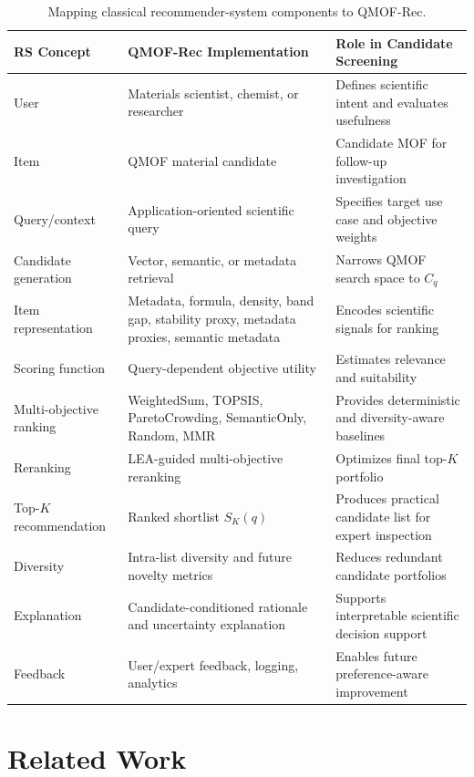 \documentclass[12pt,a4paper]{article}
\begin{document}
\begin{table}[H]
\centering
\caption{Mapping classical recommender-system components to QMOF-Rec.}
\label{tab:rec_mapping}
\small
\begin{tabular}{L{2.8cm} L{4.5cm} L{5.5cm}}
\toprule
\textbf{RS Concept} & \textbf{QMOF-Rec Implementation} & \textbf{Role in Candidate Screening}\\
\midrule
User & Materials scientist, chemist, or researcher & Defines scientific intent and evaluates usefulness\\
Item & QMOF material candidate & Candidate MOF for follow-up investigation\\
Query/context & Application-oriented scientific query & Specifies target use case and objective weights\\
Candidate generation & Vector, semantic, or metadata retrieval & Narrows QMOF search space to $C_q$\\
Item representation & Metadata, formula, density, band gap, stability proxy, metadata proxies, semantic metadata & Encodes scientific signals for ranking\\
Scoring function & Query-dependent objective utility & Estimates relevance and suitability\\
Multi-objective ranking & WeightedSum, TOPSIS, ParetoCrowding, SemanticOnly, Random, MMR & Provides deterministic and diversity-aware baselines\\
Reranking & LEA-guided multi-objective reranking & Optimizes final top-$K$ portfolio\\
Top-$K$ recommendation & Ranked shortlist $S_K(q)$ & Produces practical candidate list for expert inspection\\
Diversity & Intra-list diversity and future novelty metrics & Reduces redundant candidate portfolios\\
Explanation & Candidate-conditioned rationale and uncertainty explanation & Supports interpretable scientific decision support\\
Feedback & User/expert feedback, logging, analytics & Enables future preference-aware improvement\\
\bottomrule
\end{tabular}
\end{table}

\section{Related Work}
\label{sec:related}
\end{document}
